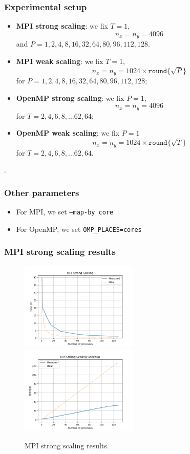 \documentclass{beamer}
\begin{document}
\begin{frame}
    \frametitle{Experimental setup}

    \begin{itemize}
        \item \textbf{MPI strong scaling}: we fix $T=1$,
            $$n_x = n_y = 4096$$
        and $P = 1, 2, 4, 8, 16, 32, 64, 80, 96, 112, 128$.
        \item \textbf{MPI weak scaling}: we fix $T=1$, 
            $$n_x = n_y = 1024 \times \texttt{round} \{\sqrt{P}\}$$
        for $P = 1, 2, 4, 8, 16, 32, 64, 80, 96, 112, 128$;
        \item \textbf{OpenMP strong scaling}: we fix $P=1$,
            $$n_x = n_y = 4096$$
        for $T = 2, 4, 6, 8, ... 62, 64$;
        \item \textbf{OpenMP weak scaling}: we fix $P=1$
            $$n_x = n_y = 1024 \times \texttt{round}\{\sqrt{T}\}$$
        for $T = 2, 4, 6, 8, ... 62, 64$.
    \end{itemize}.
\end{frame}

\begin{frame}
    \frametitle{Other parameters}
        \begin{itemize}
            \item For MPI, we set \texttt{--map-by core}
            \item For OpenMP, we set \texttt{OMP\_PLACES=cores}
        \end{itemize}
\end{frame}

\begin{frame}
    \frametitle{MPI strong scaling results}
    \begin{figure}
        \centering
        \includegraphics[width=0.5\textwidth]{../images/mpi_strong_scaling.png}
        \includegraphics[width=0.5\textwidth]{../images/mpi_strong_scaling_speedup.png}
        \caption{MPI strong scaling results.}
    \end{figure}
\end{frame}
\end{document}
